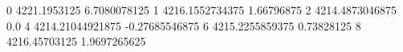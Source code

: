 0 4221.1953125 6.7080078125
1 4216.1552734375 1.66796875
2 4214.4873046875 0.0
4 4214.21044921875 -0.27685546875
6 4215.2255859375 0.73828125
8 4216.45703125 1.9697265625
